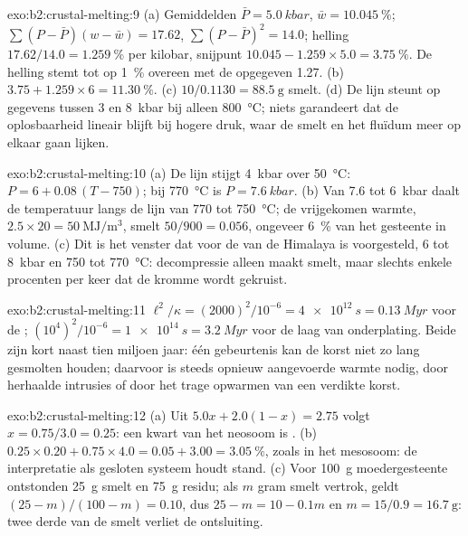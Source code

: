 \begin{solution}{exo:b2:crustal-melting:9}
(a) Gemiddelden $\bar P = \qty{5.0}{kbar}$, $\bar w = \qty{10.045}{\percent}$;
$\sum(P - \bar P)(w - \bar w) = 17.62$, $\sum(P - \bar P)^2 = 14.0$; helling
$17.62/14.0 = \qty{1.259}{\percent}$ per kilobar, snijpunt $10.045 - 1.259\times5.0 =
\qty{3.75}{\percent}$. De helling stemt tot op \qty{1}{\percent} overeen met de opgegeven
1.27. (b) $3.75 + 1.259\times6 = \qty{11.30}{\percent}$. (c) $10/0.1130 =
\qty{88.5}{\gram}$ smelt. (d) De lijn steunt op gegevens tussen 3 en \qty{8}{kbar} bij alleen
\qty{800}{\celsius}; niets garandeert dat de oplosbaarheid lineair blijft bij hogere
druk, waar de smelt en het fluïdum meer op elkaar gaan lijken.
\end{solution}

\begin{solution}{exo:b2:crustal-melting:10}
(a) De lijn stijgt \qty{4}{kbar} over \qty{50}{\celsius}: $P = 6 + 0.08\,(T - 750)$;
bij \qty{770}{\celsius} is $P = \qty{7.6}{kbar}$. (b) Van 7.6 tot \qty{6}{kbar} daalt de
temperatuur langs de lijn van 770 tot \qty{750}{\celsius}; de vrijgekomen warmte,
$2.5\times20 = \qty{50}{\mega\joule\per\cubic\metre}$, smelt $50/900 = 0.056$, ongeveer
\qty{6}{\percent} van het gesteente in volume. (c) Dit is het venster dat voor de
 van de Himalaya is voorgesteld, 6 tot \qty{8}{kbar} en 750 tot \qty{770}{\celsius}: decompressie
alleen maakt smelt, maar slechts enkele procenten per keer dat de kromme wordt gekruist.
\end{solution}

\begin{solution}{exo:b2:crustal-melting:11}
$\ell^2/\kappa = (2000)^2/10^{-6} = \qty{4e12}{s} = \qty{0.13}{Myr}$ voor de ;
$(10^4)^2/10^{-6} = \qty{1e14}{s} = \qty{3.2}{Myr}$ voor de laag van onderplating. Beide zijn kort
naast tien miljoen jaar: één gebeurtenis kan de korst niet zo lang gesmolten houden; daarvoor is
steeds opnieuw aangevoerde warmte nodig, door herhaalde intrusies of door het trage opwarmen van een
verdikte korst.
\end{solution}

\begin{solution}{exo:b2:crustal-melting:12}
(a) Uit $5.0x + 2.0(1 - x) = 2.75$ volgt $x = 0.75/3.0 = 0.25$: een kwart van het neosoom is
. (b) $0.25\times0.20 + 0.75\times4.0 = 0.05 + 3.00 = \qty{3.05}{\percent}$, zoals
in het mesosoom: de interpretatie als gesloten systeem houdt stand. (c) Voor \qty{100}{\gram}
moedergesteente ontstonden \qty{25}{\gram} smelt en \qty{75}{\gram} residu; als $m$ gram
smelt vertrok, geldt $(25 - m)/(100 - m) = 0.10$, dus $25 - m = 10 - 0.1m$ en $m = 15/0.9 =
\qty{16.7}{\gram}$: twee derde van de smelt verliet de ontsluiting.
\end{solution}

